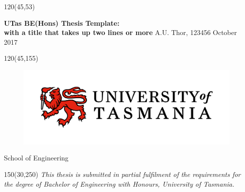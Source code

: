 \begin{textblock}{120}(45,53) %
\noindent\begin{minipage}[t][55mm][c]{\textwidth} 
\centering \Large  %
\vspace*{\fill}
{\bf UTas BE(Hons) Thesis Template:\\ with a title that takes up two lines or more}
\vfill
A.U. Thor, 123456 
\vfill
\large October 2017
\vspace*{\fill}
\end{minipage}
\end{textblock}

\begin{textblock}{120}(45,155)
\centering
\begin{figure}[h]
\centering\includegraphics[width=0.75\linewidth]{UTAS-Logo-colour-2018.jpg}
\end{figure}
\vspace{2cm}
\Large
School of Engineering


\end{textblock}


\begin{textblock}{150}(30,250)
\centering
\emph{This thesis is submitted in partial fulfilment of the requirements for the degree of
Bachelor of Engineering with Honours,
University of Tasmania.}
\end{textblock}



\null\cleardoublepage
{}
